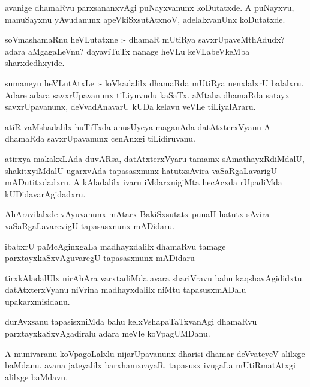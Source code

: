 \documentclass{article}
\begin{document}
\begin{mn}
avanige dhamaRvu parxsananxvAgi puNayxvanunx koDutatxde.  A puNayxvu,
 manuSayxnu yAvudanunx apeVkiSxsutAtxnoV, adelalxvanUnx koDutatxde.
\end{mn}

\begin{mn}
soVmashamaRnu heVLutatxne :- dhamaR mUtiRya savxrUpaveMthAdudx?  adara 
aMgagaLeVnu?  dayaviTuTx nanage heVLu keVLabeVkeMba sharxdedhxyide.
\end{mn}

\begin{mn}
sumaneyu heVLutAtxLe :- loVkadalilx dhamaRda mUtiRya nenxlalxrU balalxru. 
Adare adara savxrUpavanunx tiLiyuvudu kaSaTx. aMtaha dhamaRda satayx 
savxrUpavanunx, deVvadAnavarU kUDa kelavu veVLe tiLiyalAraru.
\end{mn}

\begin{mn}
atiR vaMshadalilx huTiTxda anusUyeya maganAda datAtxterxVyanu A dhamaRda 
savxrUpavanunx cenAnxgi tiLidiruvanu.
\end{mn}

\begin{mn}
atirxya makakxLAda duvARsa, datAtxterxVyaru tamamx sAmathayxRdiMdalU, 
shakitxyiMdalU ugarxvAda tapasasxnunx hatutxsAvira vaSaRgaLavarigU mADutitxdadxru.
 A kAladalilx ivaru iMdarxnigiMta hecAcxda rUpadiMda kUDidavarAgidadxru.
\end{mn}

\begin{mn}
AhAravilalxde vAyuvanunx mAtarx BakiSxsutatx punaH hatutx sAvira vaSaRgaLavarevigU 
tapasasxnunx mADidaru.
\end{mn}

\begin{mn}
ibabxrU paMcAginxgaLa madhayxdalilx dhamaRvu tamage parxtayxkaSxvAguvaregU 
tapasasxnunx mADidaru
\end{mn}

\begin{mn}
tirxkAladalUlx nirAhAra varxtadiMda avara shariVravu bahu kaqshavAgididxtu. 
 datAtxterxVyanu niVrina madhayxdalilx niMtu tapasusxmADalu upakarxmisidanu.
\end{mn}

\begin{mn}
durAvxsanu tapasisxniMda bahu kelxVshapaTaTxvanAgi dhamaRvu parxtayxkaSxvAgadiralu 
adara meVle koVpagUMDanu. 
\end{mn}

\begin{mn}
A munivaranu koVpagoLalxlu nijarUpavanunx  dharisi dhamar deVvateyeV alilxge baMdanu. 
 avana jateyalilx barxhamxcayaR, tapasusx ivugaLa mUtiRmatAtxgi alilxge baMdavu.
\end{mn}
\end{document}
